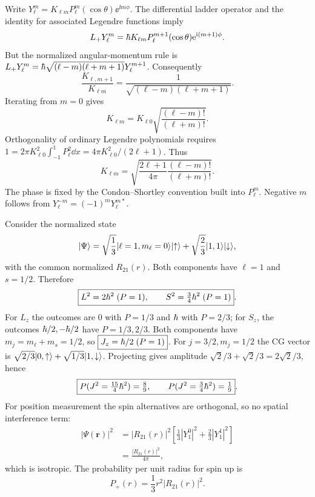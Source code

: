 Write $Y_\ell^m=K_{\ell m}
P_\ell^m(\cos\theta)\ee^{\ii m\phi}$.
The differential ladder operator and
the identity for associated Legendre
functions imply
\begin{equation}
L_+Y_\ell^m=\hbar K_{\ell m}
P_\ell^{m+1}(\cos\theta)
\mathrm e^{\mathrm i(m+1)\phi}.
\end{equation}
But the normalized angular-momentum rule is
$L_+Y_\ell^m=
\hbar\sqrt{(\ell-m)(\ell+m+1)}Y_\ell^{m+1}$.
Consequently
\begin{equation}
\boxed{\frac{K_{\ell,m+1}}{K_{\ell m}}
=\frac1{\sqrt{(\ell-m)(\ell+m+1)}}}.
\end{equation}
Iterating from $m=0$ gives
\begin{equation}
K_{\ell m}=K_{\ell0}
\sqrt{\frac{(\ell-m)!}{(\ell+m)!}}.
\end{equation}
Orthogonality of ordinary Legendre polynomials
requires
$1=2\pi K_{\ell0}^2\int_{-1}^1P_\ell^2\dd x
=4\pi K_{\ell0}^2/(2\ell+1)$.
Thus
\begin{equation}
\boxed{K_{\ell m}=
\sqrt{\frac{2\ell+1}{4\pi}
\frac{(\ell-m)!}{(\ell+m)!}}}.
\end{equation}
The phase is fixed by the Condon--Shortley
convention built into $P_\ell^m$.
Negative $m$ follows from
$Y_\ell^{-m}=(-1)^mY_\ell^{m*}$.

Consider the normalized state
\begin{equation}
\lvert \Psi\rangle=\sqrt{\frac13}\lvert \ell=1,m_\ell=0\rangle
\lvert \uparrow\rangle+
\sqrt{\frac23}\lvert 1,1\rangle\lvert \downarrow\rangle,
\end{equation}
with the common normalized $R_{21}(r)$.
Both components have $\ell=1$ and $s=1/2$.
Therefore
\begin{equation}
\boxed{L^2=2\hbar^2\;(P=1),\qquad
S^2=\tfrac34\hbar^2\;(P=1)}.
\end{equation}
For $L_z$ the outcomes are $0$ with $P=1/3$
and $\hbar$ with $P=2/3$; for $S_z$, the outcomes
$\hbar/2,-\hbar/2$ have $P=1/3,2/3$.
Both components have $m_j=m_\ell+m_s=1/2$,
so $\boxed{J_z=\hbar/2\;(P=1)}$.
For $j=3/2,m_j=1/2$ the CG vector is
$\sqrt{2/3}\lvert 0,\uparrow\rangle+
\sqrt{1/3}\lvert 1,\downarrow\rangle$.
Projecting gives amplitude
$\sqrt2/3+\sqrt2/3=2\sqrt2/3$, hence
\begin{equation}
\boxed{P(J^2=\tfrac{15}{4}\hbar^2)=\tfrac89,\qquad
P(J^2=\tfrac34\hbar^2)=\tfrac19}.
\end{equation}
For position measurement the spin alternatives
are orthogonal, so no spatial interference term:
\begin{align}
|\Psi(\mathbf r)|^2&=|R_{21}(r)|^2
\left[\tfrac13|Y_1^0|^2+
\tfrac23|Y_1^1|^2\right]\\
&=\boxed{\frac{|R_{21}(r)|^2}{4\pi}},
\end{align}
which is isotropic. The probability per unit
radius for spin up is
\begin{equation}
\boxed{P_+(r)=\frac13r^2|R_{21}(r)|^2}.
\end{equation}

